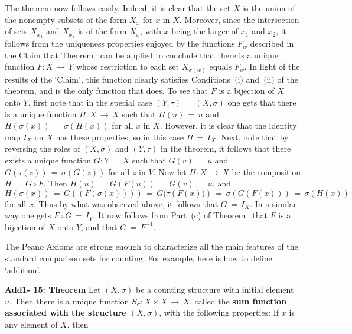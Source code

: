         The theorem now follows easily.
    Indeed, it is clear that the set $X$ is the union of the nonempty subsets of the form $X_{x}$ for $x$ in $X$.
    Moreover, since the intersection of sets $X_{x_{1}}$ and $X_{x_{2}}$ is of the form $X_{x}$, with $x$ being the larger of $x_{1}$ and $x_{2}$,
    it follows from the uniqueness properties enjoyed by the functions $F_{w}$ described in the Claim that Theorem~ can be applied to conclude that there is a unique function $F:X \,{\rightarrow}\, Y$ whose restriction to each set $X_{{\sigma}(w)}$ equals $F_{w}$.
    In light of the results of the `Claim', this function clearly satisfies Conditions~(i) and~(ii) of the theorem, and is the only function that does.
    To see that $F$ is a bijection of $X$ onto $Y$, first note that in the special case $(Y,{\tau}) \,=\, (X,{\sigma})$ one gets that there is a unique function $H:X \,{\rightarrow}\, X$ such that $H(u) \,=\, u$ and $H({\sigma}(x)) \,=\, {\sigma}\left(H(x)\right)$ for all $x$ in $X$.
    However, it is clear that the identity map $I_{X}$ on $X$ has these properties, so in this case $H \,=\, I_{X}$.
    Next, note that by reversing the roles of $(X,{\sigma})$ and $(Y,{\tau})$ in the theorem,
    it follows that there exists a unique function $G:Y \,=\, X$ such that $G(v) \,=\, u$ and $G({\tau}(z)) \,=\, {\sigma}\left(G(z)\right)$ for all $z$ in $V$.
    Now let $H:X \,{\rightarrow}\, X$ be the composition $H \,=\, G{\circ}F$. Then $H(u) \,=\, G(F(u)) \,=\, G(v) \,=\, u$, and $H({\sigma}(x)) \,=\, G((F({\sigma}(x)))) \,=\, G({\tau}\left(F(x))\right) \,=\, {\sigma}(G(F(x))) \,=\, {\sigma}(H(x))$ for all $x$.
    Thus by what was observed above, it follows that $G \,=\, I_{X}$. In a similar way one gets $F{\circ}G \,=\, I_{Y}$.
    It now follows from Part~(c) of Theorem~ that $F$ is a bijection of $X$ onto $Y$, and that $G \,=\, F^{-1}$.

\V
\V

        The Peano Axioms are strong enough to characterize all the main features of the standard comparison sets for counting.
    For example, here is how to define `addition'.

\V

        {\bf Add1- 15: Theorem} Let $(X,{\sigma})$ be a counting structure with initial element~$u$.
    Then there is a unique function $S_{{\sigma}}:X{\times}X \,{\rightarrow}\, X$, called the {\bf sum function associated with the structure $(X,{\sigma})$},
    with the following properties: If $x$ is any element of $X$, then

